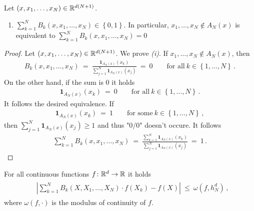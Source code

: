 \begin{lemma}
  Let $(x,x_1,\ldots,x_N)\in\mathbb{R}^{d(N+1)}$.
  \begin{enumerate}[label=(\roman*)]
    \item
      $
      \sum_{k=1}^{N} 
      B_k(x,x_1,\ldots,x_N)
      \in
      \left\{ 0,1 \right\}
      $. 
      In particular,
      $
        x_1,\ldots,x_N\notin A_N(x)
      $
      is equivalent to
      $
      \sum_{k=1}^{N} 
      B_k(x,x_1,\ldots,x_N)
      =0
      $
  \end{enumerate}
\end{lemma}
\begin{proof}
  Let $(x,x_1,\ldots,x_N)\in\mathbb{R}^{d(N+1)}$.
  We prove \textit{(i)}.
  If 
      $
        x_1,\ldots,x_N\notin A_N(x)
      $,
  then
  \begin{align*}
    B_k(
        x,x_1,\ldots,x_N
    )
    \ 
    =
    \ 
\frac
  {
    \mathbf{1}
    _{
      A_N(x)
    }
    (x_k)
  }
  {
    \sum_{j=1}^N
    \mathbf{1}
    _{
      A_N(x)
    }
    (x_j)
    }
    \ 
    =
    \ 
    0
    \qquad
    \text{for all}\ 
    k\in \left\{ 1,\ldots,N \right\}
    \,.
  \end{align*}
  On the other hand, if the sum is 0 it holds
  \begin{align*}
    \mathbf{1}
    _{
      A_N(x)
    }
    (x_k)
    \ 
  =
  \ 
  0
    \qquad
    \text{for all}\ 
    k\in \left\{ 1,\ldots,N \right\}
    \,.
  \end{align*}
  It follows the desired equivalence.
  If 
  \begin{align*}
    \mathbf{1}
    _{
      A_N(x)
    }
    (x_k)
    \ 
  =
  \ 
  1
    \qquad
    \text{for some}\ 
    k\in \left\{ 1,\ldots,N \right\}
    \,,
  \end{align*}
  then
  $
    \sum_{j=1}^N
    \mathbf{1}
    _{
      A_N(x)
    }
    (x_j)
    \ge 1
  $
  and thus "$0/0$" doesn't occure. 
  It follows
  \begin{align*}
      \sum_{k=1}^{N} 
      B_k(x,x_1,\ldots,x_N)
      \ 
      =
      \ 
\frac
  {
      \sum_{k=1}^{N} 
    \mathbf{1}
    _{
      A_N(x)
    }
    (x_k)
  }
  {
    \sum_{j=1}^N
    \mathbf{1}
    _{
      A_N(x)
    }
    (x_j)
    }
    \ 
    =
    \ 
    1
    \,.
  \end{align*}
\end{proof}
\begin{lemma}
  For all continuous functions $f\colon \mathbb{R}^d\to \mathbb{R}$ it holds
 \begin{align}
   \begin{split}
   &
   \left|
  \sum_{k=1}^{N}
    B_k(X,X_1,\ldots,X_N)\cdot 
    f(X_k)
    -
    f(X)
   \right|
   \ 
   \le
   \ 
   \omega
   \left(
    f,h_N^d
   \right)
   \,,
   \end{split}
 \end{align}
 where $\omega(f,\cdot)$ is the modulus of continuity of $f$. 

\end{lemma}

